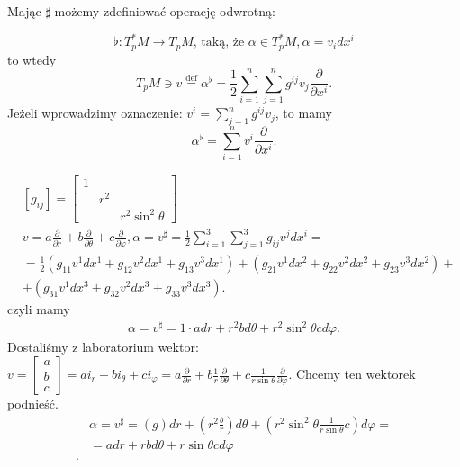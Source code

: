 \documentclass[../main.tex]{subfiles}
\begin{document}
    Mając $\sharp$ możemy zdefiniować operację odwrotną:
    \begin{definicja}
        \[
            \flat: T_p^*M\to T_pM\text{, taką, że } \alpha\in T_p^*M, \alpha = v_idx^i
        \]
        to wtedy
        \[
        T_pM \ni v \overset{\text{def}}{=} \alpha^\flat = \frac{1}{2} \sum_{i=1}^n \sum_{j=1}^n g^{ij}v_j \frac{\partial }{\partial x^i}
        .\]
        Jeżeli wprowadzimy oznaczenie: $v^i = \sum_{j=1}^n g^{ij}v_j$, to mamy
        \[
        \alpha^\flat = \sum_{i=1}^n v^i \frac{\partial }{\partial x^i}
    .\]
    \end{definicja}

    \begin{przyklad}
        \begin{align*}
            &\left[ g_{ij} \right] = \begin{bmatrix} 1&&\\ &r^2& \\ &&r^2\sin^2\theta \end{bmatrix}\\
            &v = a \frac{\partial }{\partial r} + b \frac{\partial }{\partial \theta}  + c \frac{\partial }{\partial \varphi}, \alpha = v^{\sharp} = \frac{1}{2}\sum_{i=1}^3\sum_{j=1}^3 g_{ij}v^j dx^i = \\
            &= \frac{1}{2}\left( g_{11}v^1dx^1 + g_{12}v^2dx^1+g_{13}v^3dx^1 \right) + \left( g_{21}v^1dx^2 + g_{22}v^2dx^2 + g_{23}v^3dx^2 \right) +\\
            &+ \left(  g_{31}v^1dx^3 + g_{32}v^2dx^3 + g_{33}v^3dx^3 \right)
        .\end{align*}
        czyli mamy
        \begin{align*}
            \alpha = v^{\sharp} = 1\cdot a dr + r^2 b d\theta + r^2\sin^2\theta c d\varphi
        .\end{align*}
        Dostaliśmy z laboratorium wektor: $v = \begin{bmatrix} a\\b\\c \end{bmatrix} = a i_r + b i_\theta + c i_\varphi = a \frac{\partial }{\partial r} + b \frac{1}{r} \frac{\partial }{\partial \theta} + c \frac{1}{r\sin\theta} \frac{\partial }{\partial \varphi} $.
Chcemy ten wektorek podnieść.\\
\begin{align*}
    &\alpha = v^{\sharp} = \left( g \right) dr + \left( r^2 \frac{b}{r} \right) d\theta + \left( r^2 \sin^2\theta \frac{1}{r\sin\theta}c \right) d\varphi=\\
    &= a dr + r b d\theta + r \sin\theta c d\varphi \\
.\end{align*}
    \end{przyklad}
\end{document}

